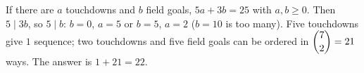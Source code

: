 If there are $a$ touchdowns and $b$ field goals, $5a+3b=25$ with $a,b\ge0$. Then $5\mid3b$, so $5\mid b$: $b=0$, $a=5$ or $b=5$, $a=2$ ($b=10$ is too many). Five touchdowns give $1$ sequence; two touchdowns and five field goals can be ordered in $\dbinom72=21$ ways. The answer is $1+21=\boxed{22}$.

